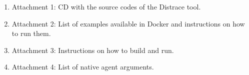 \documentclass[12pt,a4paper]{report}
\let\openright=\clearpage
\begin{document}


\setcounter{tocdepth}{1}
\tableofcontents











\listoffigures





\begin{enumerate}
	\item Attachment 1: CD with the source codes of the Distrace tool.
	\item Attachment 2: List of examples available in Docker and instructions on how to run them.
	\item Attachment 3: Instructions on how to build and run.
	\item Attachment 4: List of native agent arguments.
	\end{enumerate}
\openright

\setcounter{page}{1}

\setcounter{page}{1}

\setcounter{page}{1}

\end{document}
